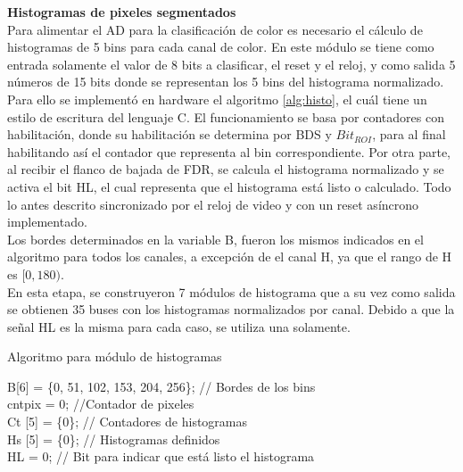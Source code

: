 \documentclass[twoside,spanish,ESP,MSc]{plantillaLabUPV}
\theoremstyle{definition}
\begin{document}
\checkmark\textbf{Histogramas de pixeles segmentados}\\ \label{sec:histo}
Para alimentar el AD para la clasificación de color es necesario el cálculo de histogramas de 5 bins para cada canal de color. En este módulo se tiene como entrada solamente el valor de 8 bits a clasificar, el reset y el reloj, y como salida 5 números de 15 bits donde se representan los 5 bins del histograma normalizado. Para ello se implementó en hardware el algoritmo \ref{alg:histo}, el cuál tiene un estilo de escritura del lenguaje C. El funcionamiento se basa por contadores con habilitación, donde su habilitación se determina por BDS y $Bit_{ROI}$, para al final habilitando así el contador que representa al bin correspondiente. Por otra parte, al recibir el flanco de bajada de FDR, se calcula el histograma normalizado y se activa el bit HL, el cual representa que el histograma está listo o calculado. Todo lo antes descrito sincronizado por el reloj de video y con un reset asíncrono implementado.\\

Los bordes determinados en la variable B, fueron los mismos indicados en el algoritmo para todos los canales, a excepción de el canal H, ya que el rango de H es $[0,180)$.\\

En esta etapa, se construyeron 7 módulos de histograma que a su vez como salida se obtienen 35 buses con los histogramas normalizados por canal. Debido a que la señal HL es la misma para cada caso, se utiliza una solamente.

\begin{algorithm} %
	\caption{Algoritmo para módulo de histogramas}
	\label{alg:histo}
	\SetAlgoLined
	
	B[6] = \{0, 51, 102, 153, 204, 256\}; // Bordes de los bins \\
	cntpix = 0; //Contador de pixeles \\
	Ct [5] = \{0\}; // Contadores de histogramas \\
	Hs [5] = \{0\}; // Histogramas definidos \\
	HL = 0; // Bit para indicar que está listo el histograma\\ 
\end{algorithm}
\end{document}
